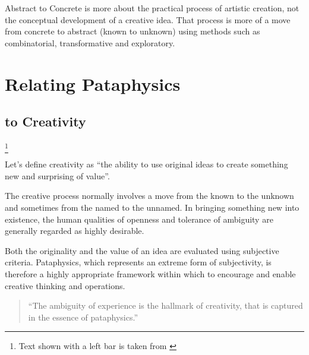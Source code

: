 \begin{draft}
  Abstract to Concrete is more about the practical process of artistic creation, not the conceptual development of a creative idea. That process is more of a move from concrete to abstract (known to unknown) using methods such as combinatorial, transformative and exploratory.
\end{draft}


\section{Relating Pataphysics}

\subsection{to Creativity}\footnote{Text shown with a left bar is taken from \autocite{Hugill2013d}}

Let's define creativity as ``the ability to use original ideas to create something new and surprising of value''.

\begin{leftbar}
The creative process normally involves a move from the known to the unknown and sometimes from the named to the unnamed. In bringing something new into existence, the human qualities of openness and tolerance of ambiguity are generally regarded as highly desirable.
\end{leftbar}

\begin{leftbar}
Both the originality and the value of an idea are evaluated using subjective criteria. Pataphysics, which represents an extreme form of subjectivity, is therefore a highly appropriate framework within which to encourage and enable creative thinking and operations.
\end{leftbar}

\begin{quote}
  ``The ambiguity of experience is the hallmark of creativity, that is captured in the essence of pataphysics.'' \autocite{Hendler2013}
\end{quote}



